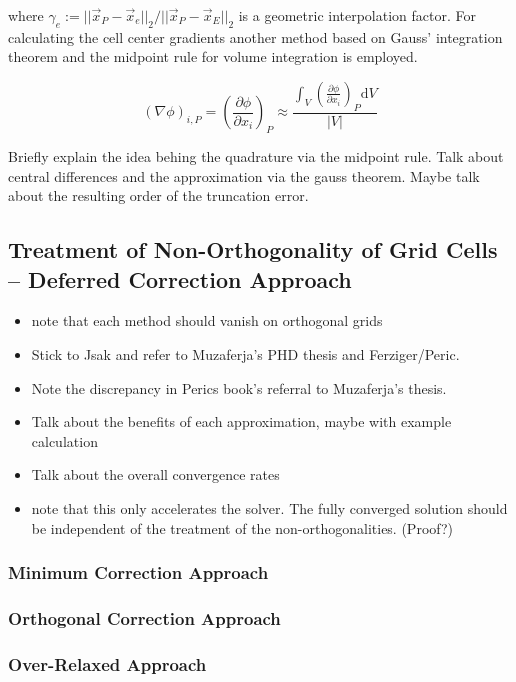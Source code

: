     where \( \gamma_e := {||\vec{x}_P - \vec{x}_e||_2}/{||\vec{x}_P - \vec{x}_E||_2}\) is a geometric interpolation factor. For calculating the cell center gradients another method based on Gauss' integration theorem and the midpoint rule for volume integration is employed.

    \begin{displaymath}
      \left( \nabla \phi \right)_{i,P}
      =
      \left( \frac{\partial \phi}{\partial x_i}\right)_P
      \approx
      \frac{\int_V\left(\frac{\partial \phi}{\partial x_i}\right)_P\mathrm{d}V}{|V|}
    \end{displaymath}

    Briefly explain the idea behing the quadrature via the midpoint rule. Talk about central differences and the approximation via the gauss theorem. Maybe talk about the resulting order of the truncation error. 

    \subsection{Treatment of Non-Orthogonality of Grid Cells -- Deferred Correction Approach}

    \begin{itemize}
      \item note that each method should vanish on orthogonal grids
      \item Stick to Jsak and refer to Muzaferja's PHD thesis and Ferziger/Peric. 
      \item Note the discrepancy in Perics book's referral to Muzaferja's thesis. 
      \item Talk about the benefits of each approximation, maybe with example calculation 
      \item Talk about the overall convergence rates
      \item note that this only accelerates the solver. The fully converged solution should be independent of the treatment of the non-orthogonalities. (Proof?)
    \end{itemize}

      \subsubsection{Minimum Correction Approach}
      \subsubsection{Orthogonal Correction Approach}
      \subsubsection{Over-Relaxed Approach}


